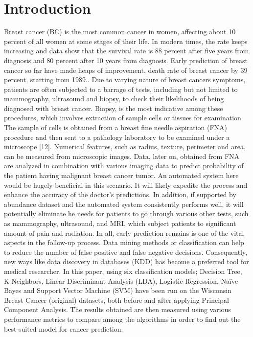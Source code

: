 \documentclass[conference]{IEEEtran}
\begin{document}
\section{Introduction}
Breast cancer (BC) is the most common cancer in women, affecting about 10 percent of all women at some stages of their life. In modern times, the rate keeps increasing and data show that the survival rate is 88 percent after five years from diagnosis and 80 percent after 10 years from diagnosis. Early prediction of breast cancer so far have made heaps of improvement, death rate of breast cancer by 39 percent, starting from 1989.. Due to varying nature of breast cancers symptoms, patients are often subjected to a barrage of tests, including but not limited to mammography, ultrasound and biopsy, to check their likelihoods of being diagnosed with breast cancer. Biopsy, is the most indicative among these procedures, which involves extraction of sample cells or tissues for examination. The sample of cells is obtained from a breast fine needle aspiration (FNA) procedure and then sent to a pathology laboratory to be examined under a microscope [12]. Numerical features, such as radius, texture, perimeter and area, can be measured from microscopic images. Data, later on, obtained from FNA are analyzed in combination with various imaging data to predict probability of the patient having malignant breast cancer tumor. An automated system here would be hugely beneficial in this scenario. It will likely expedite the process and enhance the accuracy of the doctor’s predictions. In addition, if supported by abundance dataset and the automated system consistently performs well, it will potentially eliminate  he needs for patients to go through various other tests, such as mammography, ultrasound, and MRI, which subject patients to significant amount of pain and radiation. In all, early
prediction remains is one of the vital aspects in the follow-up process. Data mining methods or classification can help to reduce the number of false positive and false negative decisions. Consequently, new ways like data discovery in databases (KDD) has become a preferred tool for medical researcher. In this paper, using six classification models; Decision Tree, K-Neighbors, Linear Discriminant Analysis (LDA), Logistic Regression, Naïve Bayes and Support Vector Machine (SVM) have been run on the Wisconsin Breast Cancer (original) datasets, both before and after applying Principal Component Analysis. The results obtained are then measured using various performance metrics to compare among the algorithms in order to find out the best-suited model for cancer prediction.
\end{document}
